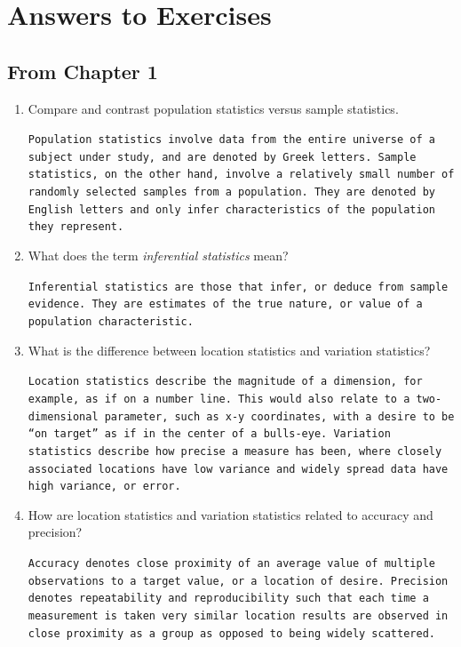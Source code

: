 \chapter{Answers to Exercises}

\section{From Chapter 1}
\begin{enumerate}
	\item Compare and contrast population statistics versus sample statistics.
	

	{\small \texttt{Population statistics involve data from the entire universe of a subject under study, and are denoted by Greek letters.  Sample statistics, on the other hand, involve a relatively small number of randomly selected samples from a pop\-u\-la\-tion. They are denoted by English letters and only infer characteristics of the population they represent.}}

	
	\item What does the term \textit{inferential statistics} mean?
	
	
	{\small \texttt{Inferential statistics are those that infer, or deduce from sample evidence. They are estimates of the true nature, or value of a population char\-ac\-ter\-is\-tic.}}

	
	\item What is the difference between location statistics and variation statistics?
	

	{\small \texttt{Location statistics describe the magnitude of a dimension, for example, as if on a number line. This would also relate to a two-dimensional parameter, such as x-y coordinates, with a desire to be ``on target'' as if in the center of a bulls-eye. Variation statistics describe how precise a measure has been, where closely associated locations have low variance and widely spread data have high variance, or error.}}

	
	\item How are location statistics and variation statistics related to accuracy and precision?  
	
	
	{\small \texttt{Accuracy denotes close proximity of an average value of multiple observations to a target value, or a location of desire.  Precision denotes re\-pea\-ta\-bil\-i\-ty and re\-pro\-duc\-i\-bil\-i\-ty such that each time a measurement is taken very similar location results are observed in close proximity as a group as opposed to being widely scattered.} }
	
\end{enumerate}


